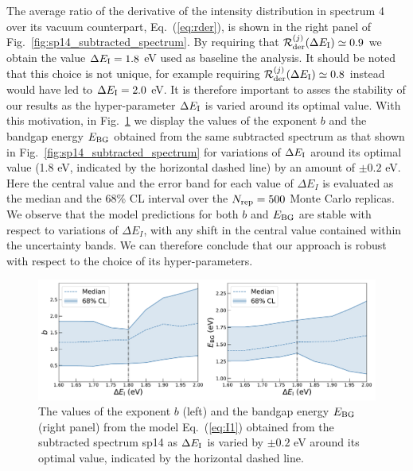 The average ratio of the derivative of the intensity
distribution in spectrum 4 over its vacuum counterpart, Eq.~(\ref{eq:rder}), is shown
in the right panel of  Fig.~\ref{fig:sp14_subtracted_spectrum}. 
%
By requiring that $\mathcal{R}^{(j)}_{\rm der}(\Delta E_{\rm I})\simeq 0.9$ we obtain
the value $\Delta E_{\rm I}=1.8$ eV used as baseline the analysis.
%
It should be noted that this choice is not unique, for example requiring
$\mathcal{R}^{(j)}_{\rm der}(\Delta E_{\rm I})\simeq 0.8$ instead would have led
to $\Delta E_{\rm I}=2.0$ eV.
%
It is therefore important to asses the stability of our results as the hyper-parameter $\Delta E_{\rm I}$
is varied around its optimal value.
%
With this motivation, in Fig.~\ref{fig:bvalues_sampleA} we display the
values of the exponent $b$
and the bandgap energy $E_{\rm BG}$ 
obtained from the same subtracted spectrum as that shown in
Fig.~\ref{fig:sp14_subtracted_spectrum} for variations of $\Delta E_{\rm I}$ 
around its optimal value (1.8 eV, indicated by the horizontal dashed line) by an amount
of $\pm 0.2$ eV.
%
Here the central value and the error band for each value of $\Delta E_I$ is evaluated
as the median and the 68\% CL interval over the $N_{\rm rep}=500$ Monte Carlo replicas.
%
We observe that the model predictions for both $b$ and $E_{\rm BG}$ are stable with respect
to variations of $\Delta E_I$, with any shift in the central value contained within the
uncertainty bands.
%
We can therefore conclude that our approach is robust with respect to the choice of its
hyper-parameters.

\begin{figure}[t]
\begin{centering}
  \includegraphics[width=0.99\linewidth]{plots/Stability_plots_sp14.pdf} 
  \caption{\small The values of the exponent $b$ (left)
    and the bandgap energy $E_{\rm BG}$ (right panel) from the model Eq.~(\ref{eq:I1})
    obtained from the subtracted spectrum sp14 as $\Delta E_{\rm I}$ is varied by $\pm 0.2$ eV
    around its optimal value, indicated by the horizontal dashed line.
  }
\label{fig:bvalues_sampleA}
\end{centering}
\end{figure}

